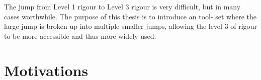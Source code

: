 The jump from Level 1 rigour to Level 3 rigour is very difficult, but in many
cases worthwhile. The purpose of this thesis is to introduce an tool- set where
the large jump is broken up into multiple smaller jumps, allowing the level 3 of
rigour to be more accessible and thus more widely used. 

\section{Motivations}

%
%
%
%

